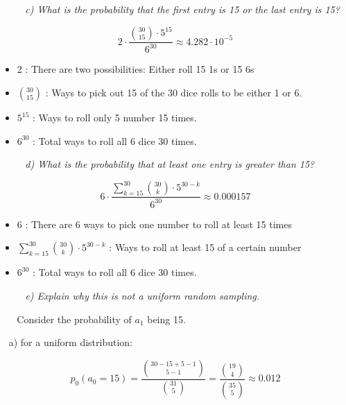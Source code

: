 \documentclass[12pt, letterpaper]{article}
\begin{document}
\-\ \newline
\-\ \newline
\-\ \it{ c) What is the probability that the first entry is 15 or the last entry is 15? }

\[ 2 \cdot \frac{{30 \choose 15} \cdot 5^{15}}{6^{30}} \approx 4.282 \cdot 10^{-5}\] 

\begin{itemize}
    \item \(2\) : There are two possibilities: Either roll 15 1s or 15 6s
    \item \({{30 \choose 15}}\) : Ways to pick out 15 of the 30 dice rolls to be either 1 or 6.
    \item \(5^{15}\) : Ways to roll only 5 number 15 times.
    \item \(6^{30}\) : Total ways to roll all 6 dice 30 times.
\end{itemize} 

\-\ \newline
\-\ \newline
\-\ \it{ d) What is the probability that at least one entry is greater than 15? }

\[ 6 \cdot \frac{ \sum_{k=15}^{30} {30 \choose k} \cdot 5^{30 - k} }{6^{30}} \approx 0.000157\]

\begin{itemize}
    \item \(6\) : There are 6 ways to pick one number to roll at least 15 times
    \item \({\sum_{k=15}^{30} {30 \choose k} \cdot 5^{30 - k}}\) : Ways to roll at least 15 of a certain number
    \item \(6^{30}\) : Total ways to roll all 6 dice 30 times.
\end{itemize} 

\-\ \newline
\-\ \newline
\-\ \it{ e) Explain why this is not a uniform random sampling.  }

\-\ \newline
\-\ \newline
\textnormal{Consider the probability of \(a_1\) being 15.}

\-\ \newline
\textnormal{a) for a uniform distribution:}

\[ p_0(a_0 = 15) = \frac{{30 - 15 + 5 - 1 \choose 5 - 1}}{{31 \choose 5}} = \frac{{19 \choose 4}}{{35 \choose 5}} \approx 0.012\]
\end{document}
